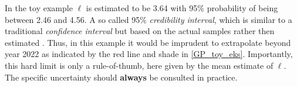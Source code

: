 \documentclass[a4paper]{article}
\begin{document}





In the toy example $\ell$ is estimated to be 3.64 with 95\% probability of being between 2.46 and 4.56. A so called 95\% \emph{credibility interval}, which is similar to a traditional \emph{confidence interval} but based on the actual samples rather then estimated \citep[54]{Mcelreath_2018}. Thus, in this example it would be imprudent to extrapolate beyond year 2022 as indicated by the red line and shade in \autoref{GP_toy_eks}. Importantly, this hard limit is only a rule-of-thumb, here given by the mean estimate of $\ell$. The specific uncertainty should \textbf{always} be consulted in practice.\par 

\end{document}
